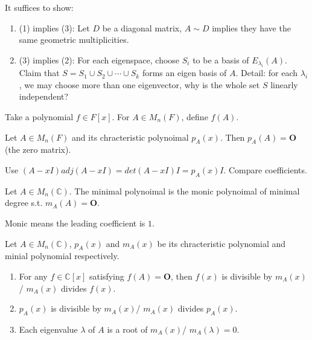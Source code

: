 \documentclass[12pt]{article}
\begin{document}
\begin{pf}
    It suffices to show:
    \begin{enumerate}
        \item (1) implies (3): Let $D$ be a diagonal matrix, $A\sim D$ implies they have the same geometric multiplicities.
        \item (3) implies (2): For each eigenspace, choose $S_i$ to be a basis of $E_{\lambda_i}(A)$. Claim that $S=S_1\cup S_2\cup\cdots\cup S_k$ forms an eigen basis of $A$. Detail: for each $\lambda_i$, we may choose more than one eigenvector, why is the whole set $S$ linearly independent?
    \end{enumerate}
\end{pf}




\begin{exercise}
    Take a polynomial $f\in F[x]$. For $A\in M_n(F)$, define $f(A)$.
\end{exercise}


\begin{theorem}
    Let $A\in M_n(F)$ and its chracteristic polynoimal $p_A(x)$.
    Then $p_A(A)=\mathbf{O}$ (the zero matrix). 
\end{theorem}

\begin{pf}
    Use $(A-xI)adj(A-xI)=det(A-xI)I=p_A(x)I$. Compare coefficients.
\end{pf}



\begin{definition}
    Let $A\in M_n(\mathbb{C})$. The minimal polynoimal is the monic polynoimal of minimal degree s.t. $m_A(A)=\mathbf{O}$.
\end{definition}

Monic means the leading coefficient is $1$.

\begin{theorem}
     Let $A\in M_n(\mathbb{C})$, $p_A(x)$ and $m_A(x)$ be its chracteristic polynomial and minial polynomial respectively.
     \begin{enumerate}
        \item For any $f\in\mathbb{C}[x]$ satisfying $f(A)=\mathbf{O}$, then $f(x)$ is divisible by $m_A(x)$/ $m_A(x)$ divides $f(x)$.
        \item $p_A(x)$ is divisible by $m_A(x)$/ $m_A(x)$ divides $p_A(x)$.
        \item Each eigenvalue $\lambda$ of $A$ is a root of $m_A(x)$/ $m_A(\lambda)=0$.
     \end{enumerate}
     \label{thm_6.9}
\end{theorem}
\end{document}

